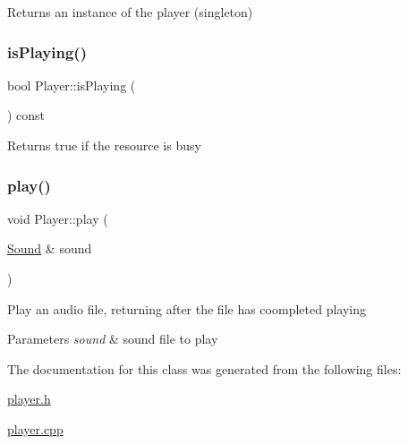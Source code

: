 \begin{DoxyReturn}{Returns}
an instance of the player (singleton) 
\end{DoxyReturn}
\mbox{\label{class_player_a06b5d53d568f357f77df80d0859fe8db}} 
\subsubsection{\texorpdfstring{is\+Playing()}{isPlaying()}}
{\footnotesize\ttfamily bool Player\+::is\+Playing (\begin{DoxyParamCaption}{ }\end{DoxyParamCaption}) const}

\begin{DoxyReturn}{Returns}
true if the resource is busy 
\end{DoxyReturn}
\mbox{\label{class_player_a895c8c46a9862e1c424720be3aa5e7d1}} 
\subsubsection{\texorpdfstring{play()}{play()}}
{\footnotesize\ttfamily void Player\+::play (\begin{DoxyParamCaption}\item[{\hyperlink{class_sound}{Sound} \&}]{sound }\end{DoxyParamCaption})}

Play an audio file, returning after the file has coompleted playing 
\begin{DoxyParams}{Parameters}
{\em sound} & sound file to play \\
\hline
\end{DoxyParams}


The documentation for this class was generated from the following files\+:\begin{DoxyCompactItemize}
\item 
\hyperlink{player_8h}{player.\+h}\item 
\hyperlink{player_8cpp}{player.\+cpp}\end{DoxyCompactItemize}
